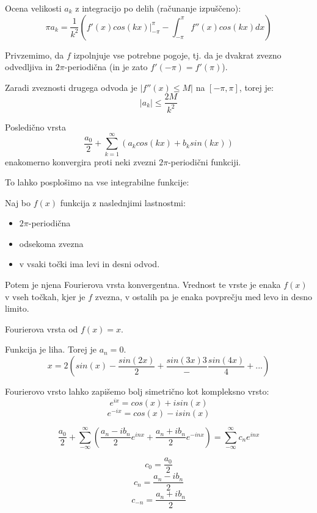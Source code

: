 \documentclass[11pt, a4paper]{article}
\begin{document}
    Ocena velikosti \(a_k\) z integracijo po delih (računanje izpuščeno):
    \[\pi a_k = \frac{1}{k^2} (f'(x) cos(kx) \Big|_{- \pi}^{\pi} - \int_{- \pi}^{\pi} f'' (x) cos(kx) dx)\]

    Privzemimo, da \(f\) izpolnjuje vse potrebne pogoje, tj. da je dvakrat zvezno odvedljiva in \(2 \pi\)-periodična (in je zato \(f' (- \pi) = f' (\pi) \)).
    \par
    Zaradi zveznosti drugega odvoda je \(|f'' (x) \le M|\) na \([- \pi, \pi]\), torej je:
    \[|a_k| \le \frac{2M}{k^2}\]

    Posledično vrsta
    \[\frac{a_0}{2} + \sum_{k=1}^{\infty} (a_k cos(kx) + b_k sin(kx))\]
    enakomerno konvergira proti neki zvezni \(2\pi\)-periodični funkciji.

    \par
    To lahko posplošimo na vse integrabilne funkcije:
    \begin{theorem}
        Naj bo \(f(x)\) funkcija z naslednjimi lastnostmi:
        \begin{itemize}
            \item \(2\pi\)-periodična
            \item odsekoma zvezna
            \item v vsaki točki ima levi in desni odvod.
        \end{itemize}
        Potem je njena Fourierova vrsta konvergentna. Vrednost te vrste je enaka \(f(x)\) v vseh točkah, kjer je \(f\) zvezna, v ostalih pa je enaka povprečju med levo in desno limito.
    \end{theorem}

    \begin{example}
        Fourierova vrsta od \(f(x) = x\).
        \par
        Funkcija je liha. Torej je \(a_n = 0\).
        \[x = 2 (sin(x) - \frac{sin(2x)}{2} + \frac{sin(3x){3}} - \frac{sin(4x)}{4} + ...)\]
    \end{example}

    Fourierovo vrsto lahko zapišemo bolj simetrično kot kompleksno vrsto:
    \[e^{ix} = cos(x) + isin(x)\]
    \[e^{-ix} = cos(x) - isin(x)\]
    
    \[\frac{a_0}{2} + \sum_{- \infty}^{\infty} (\frac{a_n - ib_n}{2} e^{inx} + \frac{a_n + ib_n}{2}e^{-inx}) = \sum_{- \infty}^{\infty} c_n e^{inx} \]
    
    \[c_0 = \frac{a_0}{2}\]
    \[c_n = \frac{a_n - ib_n}{2}\]
    \[c_{-n} = \frac{a_n + ib_n}{2}\]
\end{document}

